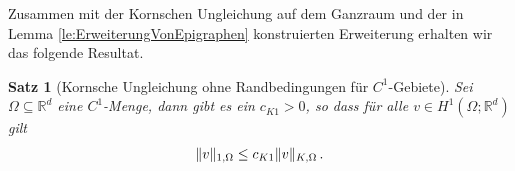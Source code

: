 \documentclass{scrartcl}
\newcounter{everything}
\newtheorem{theorem}[everything]{Satz}
\def\R{\mathbb{R}}
\def\e{\varepsilon}
\DeclarePairedDelimiter{\abs}{\lvert}{\rvert}
\DeclarePairedDelimiter{\norm}{\lVert}{\rVert}
\begin{document}
Zusammen mit der Kornschen Ungleichung auf dem Ganzraum und der in Lemma \ref{le:ErweiterungVonEpigraphen} konstruierten Erweiterung erhalten wir das folgende Resultat.
\begin{theorem}[Kornsche Ungleichung ohne Randbedingungen für $C^1$-Gebiete]\label{le:KornOhneRandbedingungen}
	Sei $\Omega\subseteq\R^d$ eine $C^1$-Menge, dann gibt es ein $c_{K1}>0$, so dass für alle $v\in H^1(\Omega;\R^d)$ gilt
	\begin{align}
		\norm{v}_{1,\Omega}\leq c_{K1}\norm{v}_{K,\Omega}\,.
		\label{eq:KornOhneRandbedingungen}
	\end{align}
\end{theorem}
\end{document}
